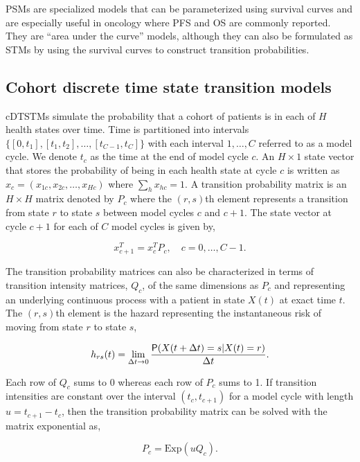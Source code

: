 \documentclass[article, nojss]{jss}\usepackage[]{graphicx}\usepackage[]{color}
\begin{document}
PSMs are specialized models that can be parameterized using survival curves and are especially useful in oncology where PFS and OS are commonly reported. They are ``area under the curve'' models, although they can also be formulated as STMs by using the survival curves to construct transition probabilities. 

\subsection{Cohort discrete time state transition models} \label{sec:cDTSTMs}
cDTSTMs simulate the probability that a cohort of patients is in each of $H$ health states over time. Time is partitioned into intervals $\{[0, t_1], [t_1, t_2], \ldots, [t_{C-1}, t_C]\}$ with each interval $1,\ldots, C$ referred to as a model cycle. We denote $t_c$ as the time at the end of model cycle $c$. An $H \times 1$ state vector that stores the probability of being in each health state at cycle $c$ is written as $x_c = (x_{1c}, x_{2c}, \ldots, x_{Hc})$ where $\sum_h x_{hc} = 1$. A transition probability matrix is an $H \times H$ matrix denoted by $P_c$ where the $(r,s)$th element represents a transition from state $r$ to state $s$ between model cycles $c$ and $c+1$. The state vector at cycle $c+1$ for each of $C$ model cycles is given by, 

\begin{equation} \label{eqn:markov-sim}
x_{c+1}^T= x_c^T P_c, \quad c = 0,\ldots, C-1.
\end{equation}

The transition probability matrices can also be characterized in terms of transition intensity matrices, $Q_c$, of the same dimensions as $P_c$ and representing an underlying continuous process with a patient in state $X(t)$ at exact time $t$. The $(r,s)$th element is the hazard representing the instantaneous risk of moving from state $r$ to state $s$,

\begin{equation} \label{eqn:hazard}
h_{rs}(t) = \lim_{\Delta t\to 0} \frac{\mathsf{P}(X(t + \Delta t) = s | X(t) = r)}{\Delta t}.
\end{equation}

Each row of $Q_c$ sums to 0 whereas each row of $P_c$ sums to 1. If transition intensities are constant over the interval $(t_c, t_{c+1})$ for a model cycle with length $u = t_{c+1}-t_c$, then the transition probability matrix can be solved with the matrix exponential as,

\begin{equation} \label{eqn:expmat}
P_c = \textrm{Exp}(uQ_c).
\end{equation}
\end{document}
